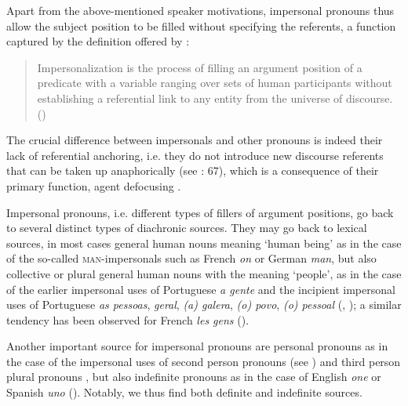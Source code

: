 \documentclass[output=paper]{langscibook}
\begin{document}
Apart from the above-mentioned speaker motivations, impersonal pronouns thus allow the subject position to be filled without specifying the referents, a function captured by the definition offered by  \citet[124]{GastvanderAuwera2013}:



\begin{quote} Impersonalization is the process of filling an argument position of a predicate with a variable ranging over sets of human participants without establishing a referential link to any entity from the universe of discourse.\\\hbox{}\hfill\hbox{(\citealt[124]{GastvanderAuwera2013})}\end{quote}



The crucial difference between impersonals and other pronouns is indeed their lack of referential anchoring, i.e. they do not introduce new discourse referents that can be taken up anaphorically (see \citealt{Siewierska2011}: 67), which is a consequence of their primary function, agent defocusing \citep[52--55]{Achard2015}.



Impersonal pronouns, i.e. different types of fillers of argument positions, go back to several distinct types of diachronic sources. They may go back to lexical sources, in most cases general human nouns meaning ‘human being’ as in the case of the so-called \textsc{man}-impersonals such as French \textit{on} or German \textit{man}, but also collective or plural general human nouns with the meaning ‘people’, as in the case of the earlier impersonal uses of Portuguese \textit{a gente} and the incipient impersonal uses of Portuguese \textit{as pessoas}, \textit{geral}, \textit{(a) galera},  \textit{(o) povo}, \textit{(o) pessoal} (\citealt{AmaralMihatsch2019, SilvaCoelho2020}, ); a similar tendency has been observed for French \textit{les gens} (\citealt{CappeauSchnedecker2015}). 



Another important source for impersonal pronouns are personal pronouns as in the case of the impersonal uses of second person pronouns (see \citealt{Kluge2016}) and third person plural pronouns \citep{Siewierska2011}, but also indefinite pronouns as in the case of English {\textit{one}} \citep{Moltmann2010} or Spanish \textit{uno} (\citealt{CompanyPozas2009}). Notably, we thus find both definite and indefinite sources.
\end{document}
